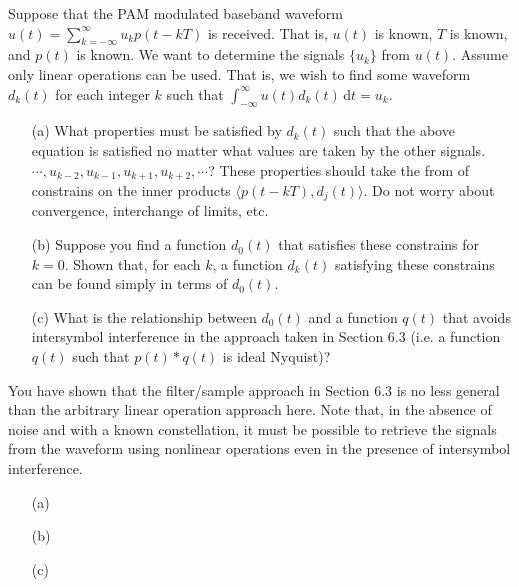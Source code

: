 \documentclass{assignment}
\begin{document}
\begin{prob}[6.4, Nyquist]
    Suppose that the PAM modulated baseband waveform $u(t)=\sum_{k=-\infty}^{\infty}u_kp(t-kT)$ is received. That is, $u(t)$ is known, $T$ is known, and $p(t)$ is known. We want to determine the signals $\{u_k\}$ from $u(t)$. Assume only linear operations can be used. That is, we wish to find some waveform $d_k(t)$ for each integer $k$ such that $\int_{-\infty}^{\infty}u(t)d_k(t)\,\mathrm{d}t=u_k$.
    \begin{itemize}
        \item[(a)] What properties must be satisfied by $d_k(t)$ such that the above equation is satisfied no matter what values are taken by the other signals. $\cdots,u_{k-2},u_{k-1},u_{k+1},u_{k+2},\cdots$? These properties should take the from of constrains on the inner products $\langle p(t-kT),d_j(t)\rangle$. Do not worry about convergence, interchange of limits, etc.
        \item[(b)] Suppose you find a function $d_0(t)$ that satisfies these constrains for $k=0$. Shown that, for each $k$, a function $d_k(t)$ satisfying these constrains can be found simply in terms of $d_0(t)$.
        \item[(c)] What is the relationship between $d_0(t)$ and a function $q(t)$ that avoids intersymbol interference in the approach taken in Section 6.3 (i.e. a function $q(t)$ such that $p(t)*q(t)$ is ideal Nyquist)?
    \end{itemize}
    You have shown that the filter/sample approach in Section 6.3 is no less general than the arbitrary linear operation approach here. Note that, in the absence of noise and with a known constellation, it must be possible to retrieve the signals from the waveform using nonlinear operations even in the presence of intersymbol interference.
\end{prob}
\begin{sol}
    \begin{itemize}
        \item[(a)] 
        \item[(b)] 
        \item[(c)] 
    \end{itemize}
\end{sol}
\end{document}
